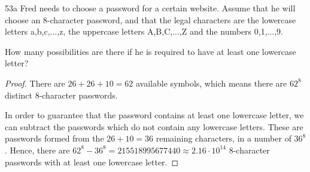 \begin{exercise}{53a}
Fred needs to choose a password for a certain website. Assume that he will choose an 8-character password, and that the legal characters are the lowercase letters a,b,c,...,z, the uppercase letters A,B,C,...,Z and the numbers 0,1,...,9.

How many possibilities are there if he is required to have at least one lowercase letter?
\end{exercise}

\begin{proof}
    There are $26+26+10=62$ available symbols, which means there are $62^8$ distinct 8-character passwords.

    In order to guarantee that the password contains at least one lowercase letter, we can subtract the passwords which do not contain any lowercase letters. These are passwords formed from the $26+10=36$ remaining characters, in a number of $36^8$. Hence, there are $62^8-36^8 = 215518995677440 \approx 2.16 \cdot 10^{14}$ 8-character passwords with at least one lowercase letter.
\end{proof}



